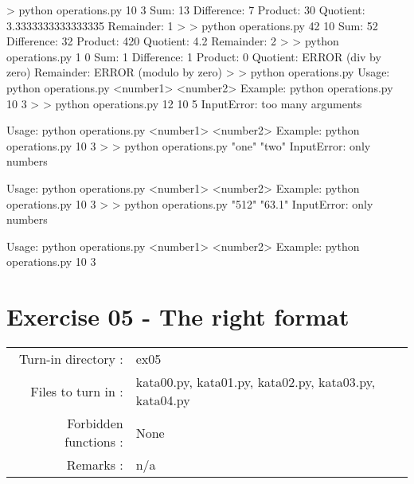 \documentclass[]{article}
\newenvironment{Shaded}{\begin{snugshade}}{\end{snugshade}}
\newcommand{\NormalTok}[1]{\textcolor[rgb]{0.81,0.81,0.76}{#1}}
\begin{document}
\begin{Shaded}
\begin{Highlighting}[]
\NormalTok{> python operations.py 10 3}
\NormalTok{Sum:         13}
\NormalTok{Difference:  7}
\NormalTok{Product:     30}
\NormalTok{Quotient:    3.3333333333333335}
\NormalTok{Remainder:   1}
\NormalTok{>}
\NormalTok{> python operations.py 42 10}
\NormalTok{Sum:         52}
\NormalTok{Difference:  32}
\NormalTok{Product:     420}
\NormalTok{Quotient:    4.2}
\NormalTok{Remainder:   2}
\NormalTok{>}
\NormalTok{> python operations.py 1 0}
\NormalTok{Sum:         1}
\NormalTok{Difference:  1}
\NormalTok{Product:     0}
\NormalTok{Quotient:    ERROR (div by zero)}
\NormalTok{Remainder:   ERROR (modulo by zero)}
\NormalTok{>}
\NormalTok{> python operations.py}
\NormalTok{Usage: python operations.py <number1> <number2>}
\NormalTok{Example:}
\NormalTok{    python operations.py 10 3}
\NormalTok{>}
\NormalTok{> python operations.py 12 10 5}
\NormalTok{InputError: too many arguments}

\NormalTok{Usage: python operations.py <number1> <number2>}
\NormalTok{Example:}
\NormalTok{    python operations.py 10 3}
\NormalTok{>}
\NormalTok{> python operations.py "one" "two"}
\NormalTok{InputError: only numbers}

\NormalTok{Usage: python operations.py <number1> <number2>}
\NormalTok{Example:}
\NormalTok{    python operations.py 10 3}
\NormalTok{>}
\NormalTok{> python operations.py "512" "63.1"}
\NormalTok{InputError: only numbers}

\NormalTok{Usage: python operations.py <number1> <number2>}
\NormalTok{Example:}
\NormalTok{    python operations.py 10 3}
\end{Highlighting}
\end{Shaded}

\clearpage

\hypertarget{exercise-05---the-right-format-1}{%
\section{Exercise 05 - The right
format}\label{exercise-05---the-right-format-1}}

\begin{longtable}[]{@{}rl@{}}
\toprule
\endhead
Turn-in directory : & ex05\tabularnewline
Files to turn in : & kata00.py, kata01.py, kata02.py, kata03.py,
kata04.py\tabularnewline
Forbidden functions : & None\tabularnewline
Remarks : & n/a\tabularnewline
\bottomrule
\end{longtable}
\end{document}
